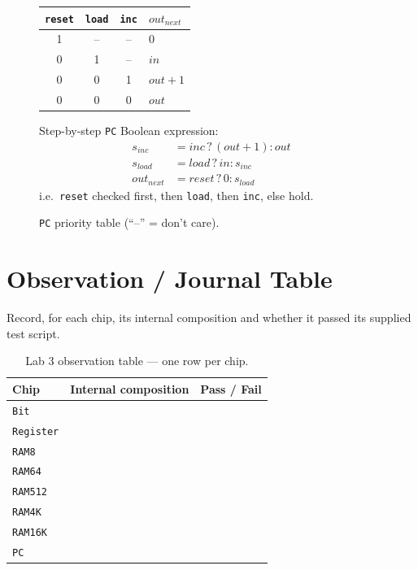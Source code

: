 \documentclass[11pt]{article}
\begin{document}
\begin{figure}[H]
  \centering
  \begin{minipage}[t]{0.5\linewidth}
    \centering
    \small
    \begin{tabular}[t]{@{}c c c l@{}}
    \toprule
    \texttt{reset} & \texttt{load} & \texttt{inc} & $out_{next}$ \\
    \midrule
    1 & -- & -- & $0$ \\
    0 & 1 & -- & $in$ \\
    0 & 0 & 1 & $out+1$ \\
    0 & 0 & 0 & $out$ \\
    \bottomrule
    \end{tabular}
    \caption{\texttt{PC} priority table (``--'' = don't care).}
    \label{fig:lab3-pc-tt}
  \end{minipage}\hfill
  \begin{minipage}[t]{0.46\linewidth}
    \small
    Step-by-step \texttt{PC} Boolean expression:
    \begin{align}
      s_{inc}  &= inc\,?\,(out{+}1) : out \nonumber\\
      s_{load} &= load\,?\,in : s_{inc} \nonumber\\
      out_{next} &= reset\,?\,0 : s_{load} \nonumber
    \end{align}
    \smallskip
    i.e.\ \texttt{reset} checked first, then \texttt{load}, then \texttt{inc}, else hold.
  \end{minipage}
\end{figure}

\section{Observation / Journal Table}

Record, for each chip, its internal composition and whether it passed its supplied test script.

\begin{table}[h]
\centering
\small
\begin{tabular}{@{}l l c@{}}
\toprule
Chip & Internal composition & Pass / Fail \\
\midrule
\texttt{Bit} & & \\
\texttt{Register} & & \\
\texttt{RAM8} & & \\
\texttt{RAM64} & & \\
\texttt{RAM512} & & \\
\texttt{RAM4K} & & \\
\texttt{RAM16K} & & \\
\texttt{PC} & & \\
\bottomrule
\end{tabular}
\caption{Lab 3 observation table --- one row per chip.}
\label{tab:lab3-observations}
\end{table}
\end{document}
